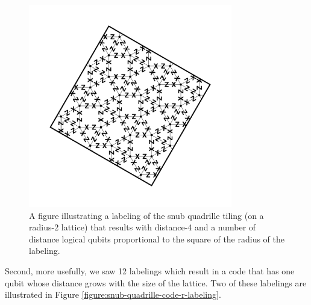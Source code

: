 \documentclass[twocolumn,showpacs,preprintnumbers,amsmath,amssymb,nofootinbib,pra,floatfix]{revtex4-1}
\begin{document}
\begin{figure}
\includegraphics[width=3.5in]{snub-quadrille-code-4-labeling} %
\caption{
\label{figure:snub-quadrille-code-4-labeling}
A figure illustrating a labeling of the snub quadrille tiling (on a radius-2 lattice) that results with distance-4 and a number of distance logical qubits proportional to the square of the radius of the labeling.
}
\end{figure}

Second, more usefully, we saw 12 labelings which result in a code that has one qubit whose distance grows with the size of the lattice.  Two of these labelings are illustrated in Figure \ref{figure:snub-quadrille-code-r-labeling}.
\end{document}

